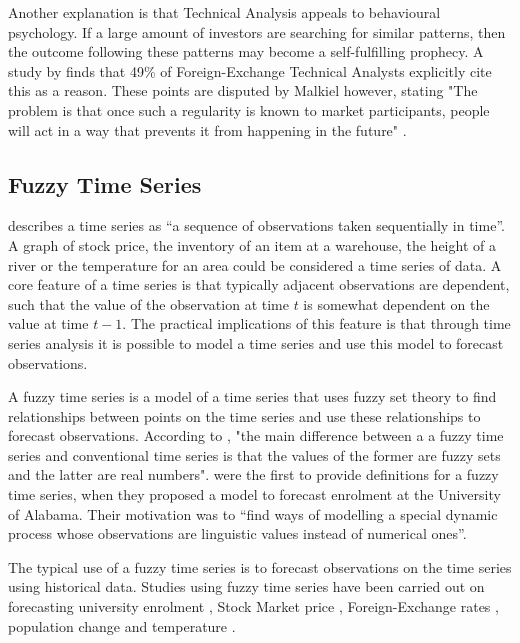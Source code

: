 \documentclass{article}
\theoremstyle{definition}
\begin{document}
Another explanation is that Technical Analysis appeals to behavioural psychology. If a large amount of investors are searching for similar patterns, then the outcome following these patterns may become a self-fulfilling prophecy. A study by \cite{examininguse1997} finds that 49\% of Foreign-Exchange Technical Analysts explicitly cite this as a reason. These points are disputed by Malkiel however, stating "The problem is that once such a regularity is known to market participants, people will act in a way that prevents it from happening in the future" \cite[p.162]{randomwalk2012}.

\subsection{Fuzzy Time Series}

\cite{box2013time} describes a time series as ``a sequence of observations taken sequentially in time''. A graph of stock price, the inventory of an item at a warehouse, the height of a river or the temperature for an area could be considered a time series of data. A core feature of a time series is that typically adjacent observations are dependent, such that the value of the observation at time $t$ is somewhat dependent on the value at time $t-1$. The practical implications of this feature is that through time series analysis it is possible to model a time series and use this model to forecast observations.

A fuzzy time series is a model of a time series that uses fuzzy set theory to find relationships between points on the time series and use these relationships to forecast observations. According to \cite{chen1996forecasting}, "the main difference between a a fuzzy time series and conventional time series is that the values of the former are fuzzy sets and the latter are real numbers". \cite{song1993forecasting} were the first to provide definitions for a fuzzy time series, when they proposed a model to forecast enrolment at the University of Alabama. Their motivation was to ``find ways of modelling a special dynamic process whose observations are linguistic values instead of numerical ones''. 

The typical use of a fuzzy time series is to forecast observations on the time series using historical data. Studies using fuzzy time series have been carried out on forecasting university enrolment \citep{song1993forecasting, song1994forecasting, chen1996forecasting, tsai2000forecasting, chen2004new, cheng2006trend, lee2006pattern, huarng2006ratio, tsaur2012fuzzy}, Stock Market price \citep{huarng2005type, cheng2006trend, lee2006pattern, huarng2006ratio, Chen2007fib, chu2009fuzzy}, Foreign-Exchange rates \citep{tsaur2012fuzzy}, population change \citep{tsai1999study} and temperature \citep{temperatureprediction2000, lee2006pattern}. 
\end{document}
